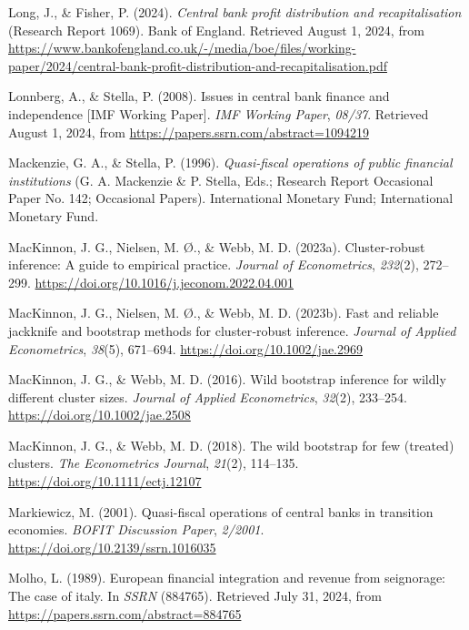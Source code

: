 \documentclass[
  a4paper,
  abstract=true]{scrartcl}
\newlength{\cslhangindent}
\newenvironment{CSLReferences}[2] %
 {\begin{list}{}{%
  \setlength{\itemindent}{0pt}
  \setlength{\leftmargin}{0pt}
  \setlength{\parsep}{0pt}
  \ifodd #1
   \setlength{\leftmargin}{\cslhangindent}
   \setlength{\itemindent}{-1\cslhangindent}
  \fi
  \setlength{\itemsep}{#2\baselineskip}}}
 {\end{list}}
\theoremstyle{definition}
\begin{document}
\begin{CSLReferences}{1}{0}
Long, J., \& Fisher, P. (2024). \emph{Central bank profit distribution
and recapitalisation} (Research Report 1069). Bank of England. Retrieved
August 1, 2024, from
\url{https://www.bankofengland.co.uk/-/media/boe/files/working-paper/2024/central-bank-profit-distribution-and-recapitalisation.pdf}

Lonnberg, A., \& Stella, P. (2008). Issues in central bank finance and
independence {[}IMF Working Paper{]}. \emph{IMF Working Paper},
\emph{08/37}. Retrieved August 1, 2024, from
\url{https://papers.ssrn.com/abstract=1094219}

Mackenzie, G. A., \& Stella, P. (1996). \emph{Quasi-fiscal operations of
public financial institutions} (G. A. Mackenzie \& P. Stella, Eds.;
Research Report Occasional Paper No. 142; Occasional Papers).
International Monetary Fund; International Monetary Fund.

MacKinnon, J. G., Nielsen, M. Ø., \& Webb, M. D. (2023a). Cluster-robust
inference: A guide to empirical practice. \emph{Journal of
Econometrics}, \emph{232}(2), 272--299.
\url{https://doi.org/10.1016/j.jeconom.2022.04.001}

MacKinnon, J. G., Nielsen, M. Ø., \& Webb, M. D. (2023b). Fast and
reliable jackknife and bootstrap methods for cluster‐robust inference.
\emph{Journal of Applied Econometrics}, \emph{38}(5), 671--694.
\url{https://doi.org/10.1002/jae.2969}

MacKinnon, J. G., \& Webb, M. D. (2016). Wild bootstrap inference for
wildly different cluster sizes. \emph{Journal of Applied Econometrics},
\emph{32}(2), 233--254. \url{https://doi.org/10.1002/jae.2508}

MacKinnon, J. G., \& Webb, M. D. (2018). The wild bootstrap for few
(treated) clusters. \emph{The Econometrics Journal}, \emph{21}(2),
114--135. \url{https://doi.org/10.1111/ectj.12107}

Markiewicz, M. (2001). Quasi-fiscal operations of central banks in
transition economies. \emph{BOFIT Discussion Paper}, \emph{2/2001}.
\url{https://doi.org/10.2139/ssrn.1016035}

Molho, L. (1989). European financial integration and revenue from
seignorage: The case of italy. In \emph{SSRN} (884765). Retrieved July
31, 2024, from \url{https://papers.ssrn.com/abstract=884765}


\end{CSLReferences}
\end{document}
